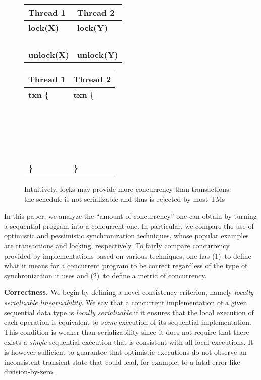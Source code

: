 \documentclass[11pt,pdftex,letterpaper]{article}
\begin{document}
{\begin{figure}[b]
  \setlength\tabcolsep{5pt}
    \footnotesize
    \begin{minipage}[b]{0.4\columnwidth}
      \begin{tabular}{l|l}
	Thread 1 & Thread 2 \\ \hline
	{\bf lock(X)} & {\bf lock(Y)}  \\
	 & \\
	&  \\
	&  \\
	 &  \\
	{\bf unlock(X)} & {\bf unlock(Y)}  \\
      \end{tabular}
    \end{minipage}
    \hspace{4em}
    \begin{minipage}[b]{0.4\columnwidth}
      \begin{tabular}{l|l}
	Thread 1 & Thread 2 \\ \hline
	{\bf txn} \{ & {\bf txn} \{ \\
	~~~~ &  \\
	 & ~~~~ \\
	& ~~~~ \\
	~~~~ &  \\
        {\bf \}}  &      {\bf \}}\\
      \end{tabular}
    \end{minipage}
  \caption{Intuitively, locks may provide more concurrency than
    transactions: the schedule is not serializable and thus is
    rejected by most TMs}
\label{fig:locksvstm}
\end{figure}
}

In this paper, we analyze the ``amount of concurrency'' one can obtain by turning a sequential program into a concurrent one.
In particular, we compare the use of 
optimistic and pessimistic
synchronization techniques,  whose popular examples are transactions and locking, respectively.
To fairly compare concurrency provided by implementations
based on various techniques,    
one has (1)~to  define what it means for a concurrent program to be
correct regardless of the type of  synchronization it uses and 
(2)~to define a metric of concurrency. 


\vspace{1mm}\noindent\textbf{Correctness.}
We begin by defining a novel consistency criterion,
namely \emph{locally-serializable linearizability}.
We say that a concurrent implementation of a given sequential data type is
\emph{locally serializable} if it
ensures that the local execution of each 
operation 
is equivalent to \emph{some} execution of its sequential implementation.
This condition is weaker than serializability
since it does not require that there exists a \emph{single} sequential 
execution  that is consistent with all local executions.
It is however sufficient to guarantee that optimistic
executions do not observe an inconsistent transient state that could 
lead, for example, to a fatal error like division-by-zero.
\end{document}
